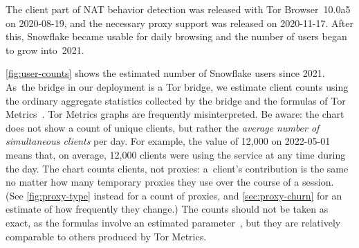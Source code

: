 \documentclass[letterpaper,twocolumn]{article}
\begin{document}
The client part of NAT behavior detection
was released with Tor Browser~10.0a5 on \mbox{2020-08-19},
and the necessary proxy support was released on \mbox{2020-11-17}.
After this, Snowflake became usable for daily browsing
and the number of users began to grow into~2021.

\autoref{fig:user-counts}
shows the estimated number of Snowflake users since 2021.
As~the bridge in our deployment is a Tor bridge,
we estimate client counts using the ordinary aggregate statistics
collected by the bridge
and the formulas of Tor Metrics~\cite{tor-tr-2012-10-001}.
Tor Metrics graphs are frequently misinterpreted.
Be aware: the chart does not show a count of unique clients,
but rather the \emph{average number of simultaneous clients} per day.
For example, the value of 12,000 on \mbox{2022-05-01}
means that, on average, 12,000 clients were using the service
at any time during the day.
The chart counts clients, not proxies:
a~client's contribution is the same no matter how many
temporary proxies they use over the course of a session.
(See \autoref{fig:proxy-type} instead for a count of proxies,
and \autoref{sec:proxy-churn} for an estimate of how frequently they change.)
The counts should not be taken as exact,
as the formulas involve an estimated parameter~\cite[\S 4]{tor-tr-2012-10-001},
but they are relatively comparable to others
produced by Tor Metrics.
\end{document}
